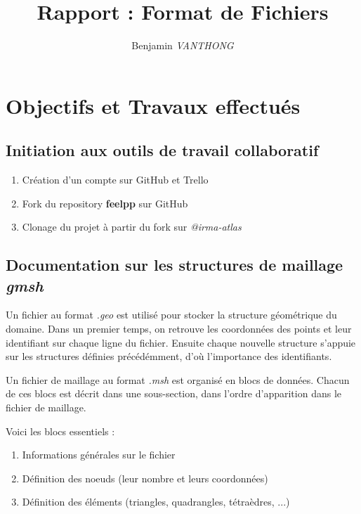 \documentclass[12pt]{article}
\title {Rapport : Format de Fichiers}
\author {Benjamin \emph{VANTHONG}}
\begin{document}
\maketitle 
\section {Objectifs et Travaux effectués}
\subsection {Initiation aux outils de travail collaboratif}
    \begin{enumerate}
        \item Création d'un compte sur GitHub et Trello
        \item Fork du repository \textbf{feelpp} sur GitHub
        \item Clonage du projet à partir du fork sur \emph{@irma-atlas}
    \end{enumerate}
\subsection {Documentation sur les structures de maillage \emph{gmsh}} 
        Un fichier au format \emph{.geo} est utilisé pour stocker la structure géométrique du domaine. Dans un premier temps, on retrouve les coordonnées des points et leur identifiant sur chaque ligne du fichier. Ensuite chaque nouvelle structure s'appuie sur les structures définies précédémment, d'où l'importance des identifiants.

        Un fichier de maillage au format \emph{.msh} est organisé en blocs de données. Chacun de ces blocs est décrit dans une sous-section, dans l'ordre d'apparition dans le fichier de maillage.         

        Voici les blocs essentiels : 
        \begin {enumerate}
            \item Informations générales sur le fichier
            \item Définition des noeuds (leur nombre et leurs coordonnées)
            \item Définition des éléments (triangles, quadrangles, tétraèdres, ...)
        \end {enumerate}
\end{document}

